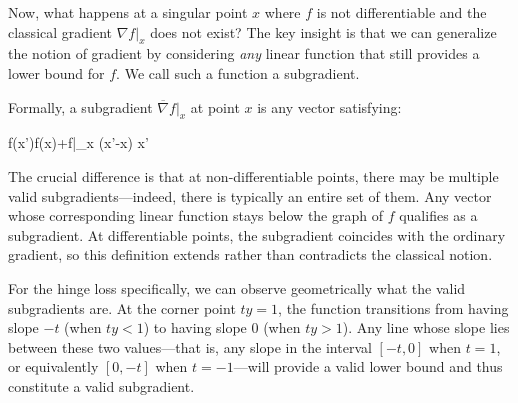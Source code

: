 \medskip 

Now, what happens at a singular point $x$ where $f$ is not differentiable and the classical gradient $\nabla f|_x$ does not exist? The key insight is that we can generalize the notion of gradient by considering \emph{any} linear function that still provides a lower bound for $f$. We call such a function a \alert{subgradient}.

Formally, a subgradient $\overline{\nabla}f|_x$ at point $x$ is any vector satisfying:
\begin{myequation}
f(x')\geq f(x)+\overline{\nabla}f|_x \cdot (x'-x) \quad {} x'
\end{myequation}

The crucial difference is that at non-differentiable points, there may be multiple valid subgradients—indeed, there is typically an entire set of them. Any vector whose corresponding linear function stays below the graph of $f$ qualifies as a subgradient. At differentiable points, the subgradient coincides with the ordinary gradient, so this definition extends rather than contradicts the classical notion.

\medskip

For the hinge loss specifically, we can observe geometrically what the valid subgradients are. At the corner point $ty=1$, the function transitions from having slope $-t$ (when $ty < 1$) to having slope $0$ (when $ty > 1$). Any line whose slope lies between these two values—that is, any slope in the interval $[-t, 0]$ when $t=1$, or equivalently $[0, -t]$ when $t=-1$—will provide a valid lower bound and thus constitute a valid subgradient.

\begin{center}
\end{center}

